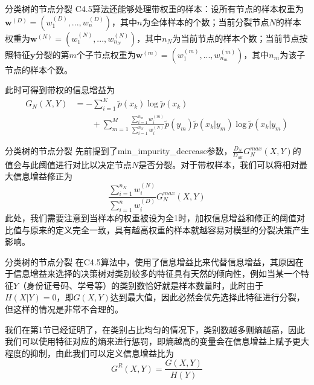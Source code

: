 \documentclass{ctexbeamer}        %
\begin{document}
\begin{frame}{分类树的节点分裂}
C4.5算法还能够处理带权重的样本：设所有节点的样本权重为$\mathbf{w}^{(D)}=(w^{(D)}_1,...,w^{(D)}_n)$，其中$n$为全体样本的个数；当前分裂节点$N$的样本权重为$\mathbf{w}^{(N)}=({w}^{(N)}_1,...,{w}^{(N)}_{n_{N}})$，其中$n_{N}$为当前节点的样本个数；当前节点按照特征$\mathbf{y}$分裂的第$m$个子节点权重为$\mathbf{w}^{(m)}=(w^{(m)}_1,...,w^{(m)}_{n_{m}})$，其中$n_m$为该子节点的样本个数。
\newline

此时可得到带权的信息增益为
\begin{align*}
G_N(X,Y)&=-\sum_{i=1}^K\tilde{p}(x_k)\log \tilde{p}(x_k)\\
&\qquad+\sum_{m=1}^M\frac{\sum_{i=1}^{n_{m}}{w}^{(m)}_{i}}{\sum_{i=1}^{n_{N}}{w}^{(N)}_{i}}\tilde{p}(y_m)\tilde{p}(x_k\vert y_m)\log \tilde{p}(x_k\vert y_m)
\end{align*}
\end{frame}

\begin{frame}{分类树的节点分裂}
先前提到了min\_impurity\_decrease参数，$\frac{D_N}{D_{all}}G^{max}_N(X,Y)$的值会与此阈值进行对比以决定节点$N$是否分裂。对于带权样本，我们可以将相对最大信息增益修正为
$$
\frac{\sum_{i=1}^{n_{N}}{w}^{(N)}_{i}}{\sum_{i=1}^{n}{w}^{(D)}_{i}}G^{max}_N(X,Y)
$$
此处，我们需要注意到当样本的权重被设为全1时，加权信息增益和修正的阈值对比值与原来的定义完全一致，具有越高权重的样本就越容易对模型的分裂决策产生影响。
\end{frame}

\begin{frame}{分类树的节点分裂}
在C4.5算法中，使用了信息增益比来代替信息增益，其原因在于信息增益来选择的决策树对类别较多的特征具有天然的倾向性，例如当某一个特征$Y$（身份证号码、学号等）的类别数恰好就是样本数量时，此时由于$H(X\vert Y)=0$，即$G(X,Y)$达到最大值，因此必然会优先选择此特征进行分裂，但这样的情况是非常不合理的。
\newline

我们在第1节已经证明了，在类别占比均匀的情况下，类别数越多则熵越高，因此我们可以使用特征对应的熵来进行惩罚，即熵越高的变量会在信息增益上赋予更大程度的抑制，由此我们可以定义信息增益比为
$$
G^R(X,Y) = \frac{G(X,Y)}{H(Y)}
$$
\end{frame}
\end{document}
